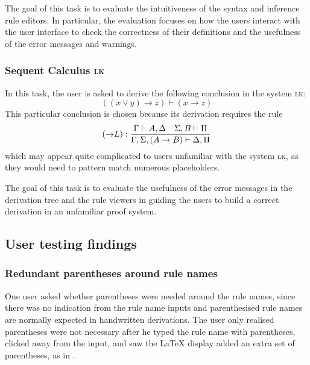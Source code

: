 The goal of this task is to evaluate the intuitiveness of the syntax and inference rule editors. In particular, the evaluation focuses on how the users interact with the user interface to check the correctness of their definitions and the usefulness of the error messages and warnings.

\subsubsection{Sequent Calculus \textsc{lk}}
In this task, the user is asked to derive the following conclusion in the system \textsc{lk}:
\[
    ((x \lor y) \to z) \vdash (x \to z)
\]
This particular conclusion is chosen because its derivation requires the rule
\[
    (\mathord{\to} L): \frac{\Gamma \vdash A, \Delta \quad \Sigma, B \vdash \Pi}{\Gamma, \Sigma, (A \rightarrow B) \vdash \Delta, \Pi}
\]
which may appear quite complicated to users unfamiliar with the system \textsc{lk}, as they would need to pattern match numerous placeholders.

The goal of this task is to evaluate the usefulness of the error messages in the derivation tree and the rule viewers in guiding the users to build a correct derivation in an unfamiliar proof system.

\subsection{User testing findings}
\subsubsection{Redundant parentheses around rule names}
One user asked whether parentheses were needed around the rule names, since there was no indication from the rule name inputs and parenthesised rule names are normally expected in handwritten derivations. The user only realised parentheses were not necessary after he typed the rule name with parentheses, clicked away from the input, and saw the \LaTeX{} display added an extra set of parentheses, as in .

